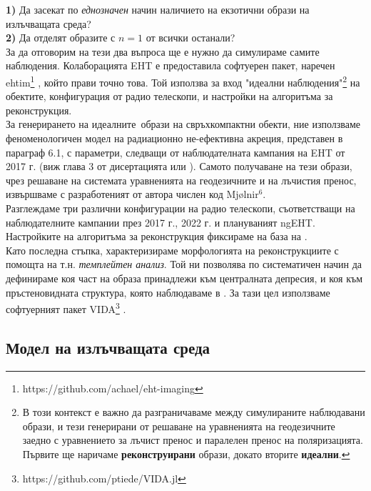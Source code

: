\documentclass[12pt]{article}
\numberwithin{equation}{section}
\numberwithin{figure}{section}
\begin{document}
	\textbf{1)} Да засекат по \emph{еднозначен} начин наличието на екзотични образи на излъчващата среда?\\
	
	\textbf{2)} Да отделят образите с $n = 1$ от всички останали?\\
	
	За да отговорим на тези два въпроса ще е нужно да симулираме самите наблюдения. Колаборацията EHT е предоставила софтуерен пакет, наречен ehtim\footnote{https://github.com/achael/eht-imaging} \cite{EHTIM}, който прави точно това. Той използва за вход "идеални наблюдения"\footnote{В този контекст е важно да разграничаваме между симулираните наблюдавани образи, и тези генерирани от решаване на уравненията на геодезичните заедно с уравнението за лъчист пренос и паралелен пренос на поляризацията. Първите ще наричаме \textbf{реконструирани} образи, докато вторите \textbf{идеални}.} на обектите, конфигурация от радио телескопи, и настройки на алгоритъма за реконструкция. \\
	
	За генерирането на идеалните$\,$ образи на свръхкомпактни обекти, ние използваме феноменологичен модел на радиационно не-ефективна акреция, представен в параграф 6.1, с параметри, следващи от наблюдателната кампания на EHT от 2017 г. (виж глава 3 от дисертацията или \cite{EHT_M87_V}\cite{EHT_M87_VIII}). Самото получаване на тези образи, чрез решаване на системата уравненията на геодезичните и на лъчистия пренос, извършваме с разработеният от автора числен код Mjølnir$^6$. \\
	
	\noindent Разглеждаме три различни конфигурации на радио телескопи, съответстващи на наблюдателните кампании през 2017 г., 2022 г. и плануваният ngEHT.\\
	
	\noindent Настройките на алгоритъма за реконструкция фиксираме на база на \cite{EHTIM}.\\
	
	\noindent Като последна стъпка, характеризираме морфологията на реконструкциите с помощта на т.н. \emph{темплейтен анализ}. Той ни позволява по систематичен начин да дефинираме коя част на образа принадлежи към централната депресия, и коя към пръстеновидната структура, която наблюдаваме в \cite{EHT_M87_I}\cite{EHT_SGR_I}. За тази цел използваме софтуерният пакет VIDA\footnote{https://github.com/ptiede/VIDA.jl} \cite{VIDA}.
	
	\newpage
	
	\subsection{Модел на излъчващата среда}
	
\end{document}
